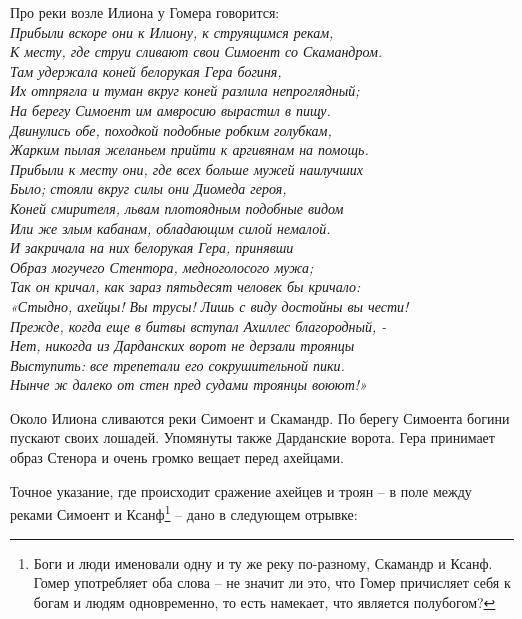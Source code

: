 Про реки возле Илиона у Гомера говорится:\\

\noindent
\textit{Прибыли вскоре они к Илиону, к струящимся рекам,\\
К месту, где струи сливают свои Симоент со Скамандром.\\
Там удержала коней белорукая Гера богиня,\\
Их отпрягла и туман вкруг коней разлила непроглядный;\\
На берегу Симоент им амвросию вырастил в пищу.\\
Двинулись обе, походкой подобные робким голубкам,\\
Жарким пылая желаньем прийти к аргивянам на помощь.\\
Прибыли к месту они, где всех больше мужей наилучших\\
Было; стояли вкруг силы они Диомеда героя,\\
Коней смирителя, львам плотоядным подобные видом\\
Или же злым кабанам, обладающим силой немалой.\\
И закричала на них белорукая Гера, принявши\\
Образ могучего Стентора, медноголосого мужа;\\
Так он кричал, как зараз пятьдесят человек бы кричало:\\
«Стыдно, ахейцы! Вы трусы! Лишь с виду достойны вы чести!\\
Прежде, когда еще в битвы вступал Ахиллес благородный, -\\
Нет, никогда из Дарданских ворот не дерзали троянцы\\
Выступить: все трепетали его сокрушительной пики.\\
Нынче ж далеко от стен пред судами троянцы воюют!»\\}

Около Илиона сливаются реки Симоент и Скамандр. По берегу Симоента богини пускают своих лошадей.  Упомянуты также Дарданские ворота. Гера принимает образ Стенора и очень громко вещает перед ахейцами.

Точное указание, где происходит сражение ахейцев и троян – в поле между реками Симоент и Ксанф\footnote{Боги и люди именовали одну и ту же реку по-разному, Скамандр и Ксанф. Гомер употребляет оба слова – не значит ли это, что Гомер причисляет себя к богам и людям одновременно, то есть намекает, что является полубогом?} – дано в следующем отрывке:\\

